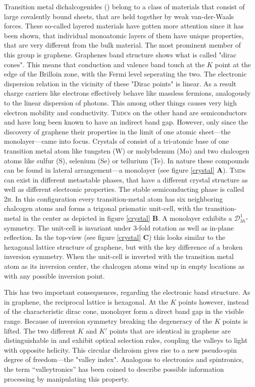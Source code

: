 Transition metal dichalcogenides (\tmds\!) belong to a class of materials that consist of large covalently bound sheets, that are held together by weak van-der-Waals forces. These so-called layered materials have gotten more attention since it has been shown, that individual monoatomic layers of them have unique properties, that are very different from the bulk material. The most prominent member of this group is graphene. Graphenes band structure shows what is called "dirac cones". This means that conduction and valence band touch at the $K$ point at the edge of the Brilloin zone, with the Fermi level seperating the two. The electronic dispersion relation in the vicinity of these "Dirac points" is linear. As a result charge carriers like electrons effectively behave like massless fermions, analogously to the linear dispersion of photons. This among other things causes very high electron mobility and conductivity. \textsc{Tmdc}s on the other hand are semiconductors and have long been known to have an indirect band gap. However, only since the discovery of graphene their properties in the limit of one atomic sheet---the monolayer---came into focus. Crystals of \tmds consist of a tri-atomic base of one transition metal atom like tungsten (W) or molybdenum (Mo) and two chalcogen atoms like sulfur (S), selenium (Se) or tellurium (Te). In nature these compounds can be found in lateral arrangement---a \tmdg monolayer (see figure \ref{crystal} \textbf{A}). \textsc{Tmd}s can exist in different metastable phases, that have a different crystal structure as well as different electronic properties\cite{ouyang_phase_2015}. The stable semiconducting phase is called 2\textsc{h}. In this configuration every transition-metal atom has six neighboring chalcogen atoms and forms a trigonal prismatic unit-cell, with the transition-metal in the center as depicted in figure \ref{crystal} \textbf{B}. A \tmdg monolayer exhibits a $\mathcal{D}^1_{3h}$-symmetry. The unit-cell is invariant under 3-fold rotation as well as in-plane reflection. In the top-view (see figure \ref{crystal} \textbf{C}) this looks similar to the hexagonal lattice structure of graphene, but with the key difference of a broken inversion symmetry. When the unit-cell is inverted with the transition metal atom as its inversion center, the chalcogen atoms wind up in empty locations as with any possible inversion point.

This has two important consequences, regarding the electronic band structure. As in graphene, the reciprocal lattice is hexagonal. At the $K$ points however, instead of the characteristic dirac cone, monolayer \tmds form a direct band gap in the visible range. Because of inversion symmetry breaking the degeneracy of the $K$ points is lifted. The two different $K$ and $K'$ points that are identical in graphene are distinguishable in \tmds and exhibit optical selection rules, coupling the valleys to light with opposite helicity. This circular dichroism gives rise to a new pseudo-spin degree of freedom---the "valley index". Analogous to electronics and spintronics, the term ``valleytronics'' has been coined to describe possible information processing by manipulating this property\cite{wang_electronics_2012, xiao_coupled_2012}. 

